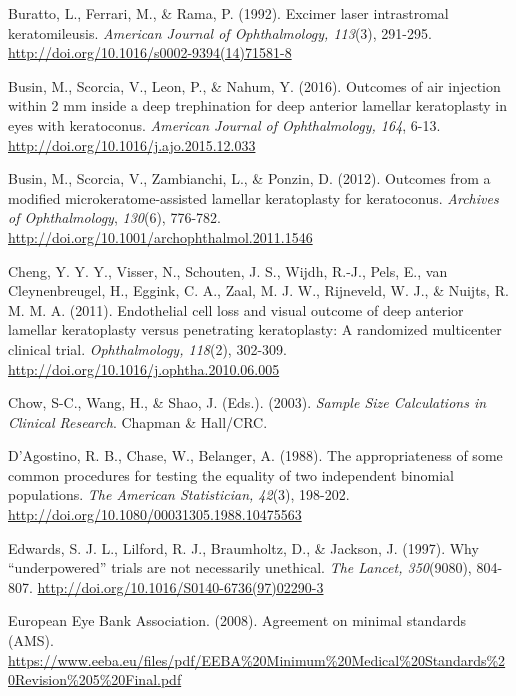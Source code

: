 \documentclass[authordate, empirical,issue]{jote-new-article}
\begin{document}
	Buratto, L., Ferrari, M., \& Rama, P. (1992). Excimer laser intrastromal keratomileusis. \emph{American Journal of Ophthalmology, 113}(3), 291-295. \url{http://doi.org/10.1016/s0002-9394(14)71581-8}



	Busin, M., Scorcia, V., Leon, P., \& Nahum, Y. (2016). Outcomes of air injection within 2 mm inside a deep trephination for deep anterior lamellar keratoplasty in eyes with keratoconus. \emph{American Journal of Ophthalmology, 164}, 6-13. \url{http://doi.org/10.1016/j.ajo.2015.12.033}



	Busin, M., Scorcia, V., Zambianchi, L., \& Ponzin, D. (2012). Outcomes from a modified microkeratome-assisted lamellar keratoplasty for keratoconus. \emph{Archives of Ophthalmology}, \emph{130}(6), 776-782. \url{http://doi.org/10.1001/archophthalmol.2011.1546}



	Cheng, Y. Y. Y., Visser, N., Schouten, J. S., Wijdh, R.-J., Pels, E., van Cleynenbreugel, H., Eggink, C. A., Zaal, M. J. W., Rijneveld, W. J., \& Nuijts, R. M. M. A. (2011). Endothelial cell loss and visual outcome of deep anterior lamellar keratoplasty versus penetrating keratoplasty: A randomized multicenter clinical trial. \emph{Ophthalmology, 118}(2), 302-309. \url{http://doi.org/10.1016/j.ophtha.2010.06.005}



	Chow, S-C., Wang, H., \& Shao, J. (Eds.). (2003). \emph{Sample Size Calculations in Clinical Research}. Chapman \& Hall/CRC.



	D'Agostino, R. B., Chase, W., Belanger, A. (1988). The appropriateness of some common procedures for testing the equality of two independent binomial populations. \emph{The American Statistician, 42}(3), 198-202. \url{http://doi.org/10.1080/00031305.1988.10475563}



	Edwards, S. J. L., Lilford, R. J., Braumholtz, D., \& Jackson, J. (1997). Why “underpowered” trials are not necessarily unethical. \emph{The Lancet, 350}(9080), 804-807. \url{http://doi.org/10.1016/S0140-6736(97)02290-3}



	European Eye Bank Association. (2008). Agreement on minimal standards (AMS). \url{https://www.eeba.eu/files/pdf/EEBA%20Minimum%20Medical%20Standards%20Revision%205%20Final.pdf}
\end{document}
